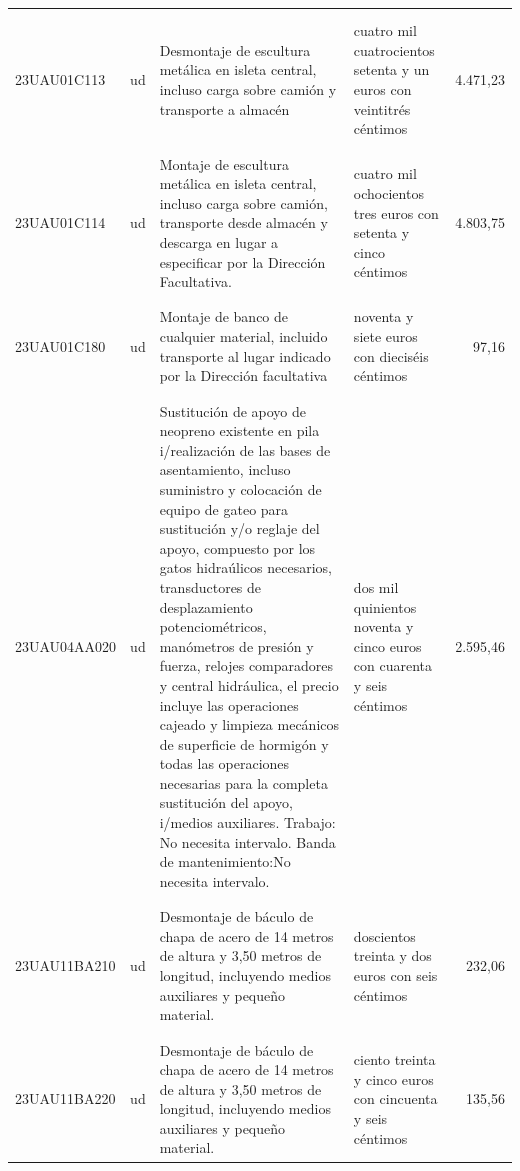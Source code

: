 \documentclass{book}%
\begin{document}
\begin{supertabular}{|l|l|p{5cm}|p{3cm}|r|}
&&&&\\%
&&&&\\%
23UAU01C113&ud&Desmontaje de escultura metálica en isleta central, incluso carga sobre camión y transporte a almacén&cuatro mil cuatrocientos setenta y un euros con veintitrés céntimos&4.471,23\\%
&&&&\\%
&&&&\\%
23UAU01C114&ud&Montaje de escultura metálica en isleta central, incluso carga sobre camión, transporte desde almacén y descarga en lugar a especificar por la Dirección Facultativa.&cuatro mil ochocientos tres euros con setenta y cinco céntimos&4.803,75\\%
&&&&\\%
&&&&\\%
23UAU01C180&ud&Montaje de banco de cualquier material, incluido transporte al lugar indicado por la Dirección facultativa&noventa y siete euros con dieciséis céntimos&97,16\\%
&&&&\\%
&&&&\\%
23UAU04AA020&ud&Sustitución de apoyo de neopreno existente en pila i/realización de las bases de asentamiento, incluso suministro y colocación de equipo de gateo para sustitución y/o reglaje del apoyo, compuesto por los gatos hidraúlicos necesarios, transductores de desplazamiento potenciométricos, manómetros de presión y fuerza, relojes comparadores y central hidráulica, el precio incluye las operaciones cajeado y limpieza mecánicos de superficie de hormigón y todas las operaciones necesarias para la completa sustitución del apoyo, i/medios auxiliares. Trabajo: No necesita intervalo. Banda de mantenimiento:No necesita intervalo.&dos mil quinientos noventa y cinco euros con cuarenta y seis céntimos&2.595,46\\%
&&&&\\%
&&&&\\%
23UAU11BA210&ud&Desmontaje de báculo de chapa de acero de 14 metros de altura y 3,50 metros de longitud, incluyendo medios auxiliares y pequeño material.&doscientos treinta y dos euros con seis céntimos&232,06\\%
&&&&\\%
&&&&\\%
23UAU11BA220&ud&Desmontaje de báculo de chapa de acero de 14 metros de altura y 3,50 metros de longitud, incluyendo medios auxiliares y pequeño material.&ciento treinta y cinco euros con cincuenta y seis céntimos&135,56\\%

\end{supertabular}
\end{document}
